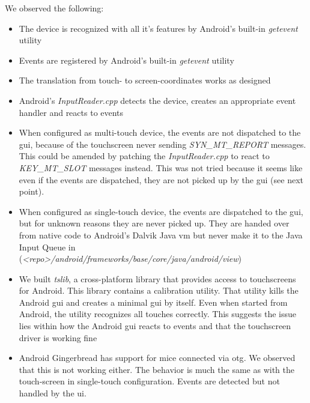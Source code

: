 We observed the following:
\begin{itemize}
	\item The device is recognized with all it's features by Android's built-in
		\emph{getevent} utility
	\item Events are registered by Android's built-in \emph{getevent} utility
	\item The translation from touch- to screen-coordinates works as designed
	\item Android's \emph{InputReader.cpp} detects the device, creates an
		appropriate event handler and reacts to events
	\item When configured as multi-touch device, the events are not dispatched
		to the \gls{gui}, because of the touchscreen never sending
		\emph{SYN\_MT\_REPORT} messages.
		This could be amended by patching the \emph{InputReader.cpp} to react to
		\emph{KEY\_MT\_SLOT} messages instead.
		This was not tried because it seems like even if the events are
		dispatched, they are not picked up by the \gls{gui} (see next point).
	\item When configured as single-touch device, the events are dispatched to
		the \gls{gui}, but for unknown reasons they are never picked up.
		They are handed over from native code to Android's Dalvik Java \gls{vm}
		but never make it to the Java Input Queue in\\
		(\emph{<repo>/android/frameworks/base/core/java/android/view})
	\item We built \emph{tslib}, a cross-platform library that provides access
		to touchscreens for Android.
		This library contains a calibration utility.
		That utility kills the Android \gls{gui} and creates a minimal \gls{gui}
		by itself.
		Even when started from Android, the utility recognizes all touches
		correctly.
		This suggests the issue lies within how the Android \gls{gui} reacts to
		events and that the touchscreen driver is working fine
	\item Android Gingerbread has support for mice connected via \gls{otg}.
		We observed that this is not working either.
		The behavior is much the same as with the touch-screen in single-touch
		configuration.
		Events are detected but not handled by the \gls{ui}.
\end{itemize}
